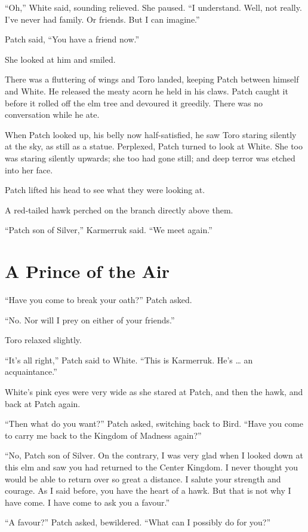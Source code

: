\documentclass[ebook,oneside,openany,12pt]{memoir}
\begin{document}
“Oh,” White said, sounding relieved. She paused. “I understand. Well,
not really. I’ve never had family. Or friends. But I can imagine.”

Patch said, “You have a friend now.”

She looked at him and smiled.

There was a fluttering of wings and Toro landed, keeping Patch between
himself and White. He released the meaty acorn he held in his
claws. Patch caught it before it rolled off the elm tree and devoured
it greedily. There was no conversation while he ate.

When Patch looked up, his belly now half-satisfied, he saw Toro
staring silently at the sky, as still as a statue. Perplexed, Patch
turned to look at White. She too was staring silently upwards; she too
had gone still; and deep terror was etched into her face.

Patch lifted his head to see what they were looking at.

A red-tailed hawk perched on the branch directly above them.

“Patch son of Silver,” Karmerruk said. “We meet again.”


\section{A Prince of the Air}

“Have you come to break your oath?” Patch asked.

“No. Nor will I prey on either of your friends.”

Toro relaxed slightly.

“It’s all right,” Patch said to White. “This is Karmerruk. He’s … an
acquaintance.”

White’s pink eyes were very wide as she stared at Patch, and then the
hawk, and back at Patch again.

“Then what do you want?” Patch asked, switching back to Bird. “Have
you come to carry me back to the Kingdom of Madness again?”

“No, Patch son of Silver. On the contrary, I was very glad when I
looked down at this elm and saw you had returned to the Center
Kingdom. I never thought you would be able to return over so great a
distance. I salute your strength and courage. As I said before, you
have the heart of a hawk. But that is not why I have come. I have come
to ask you a favour.”

“A favour?” Patch asked, bewildered. “What can I possibly do for you?”
\end{document}
